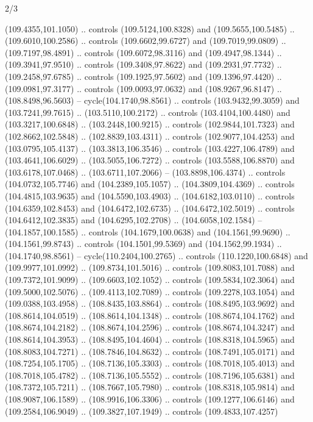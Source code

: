 \begin{flagdescription}{2/3}
\begin{scope}[shift={(0.5\flaglength,0.5)},scale=\flagwidth/320]
\begin{scope}[y=0.8pt, x=0.8pt, yscale=-1,shift={(-118.3,-146)}]
  (109.4355,101.1050) .. controls (109.5124,100.8328) and (109.5655,100.5485) ..
  (109.6010,100.2586) .. controls (109.6602,99.6727) and (109.7019,99.0809) ..
  (109.7197,98.4891) .. controls (109.6072,98.3116) and (109.4947,98.1344) ..
  (109.3941,97.9510) .. controls (109.3408,97.8622) and (109.2931,97.7732) ..
  (109.2458,97.6785) .. controls (109.1925,97.5602) and (109.1396,97.4420) ..
  (109.0981,97.3177) .. controls (109.0093,97.0632) and (108.9267,96.8147) ..
  (108.8498,96.5603) -- cycle(104.1740,98.8561) .. controls (103.9432,99.3059)
  and (103.7241,99.7615) .. (103.5110,100.2172) .. controls (103.4104,100.4480)
  and (103.3217,100.6848) .. (103.2448,100.9215) .. controls (102.9844,101.7323)
  and (102.8662,102.5848) .. (102.8839,103.4311) .. controls (102.9077,104.4253)
  and (103.0795,105.4137) .. (103.3813,106.3546) .. controls (103.4227,106.4789)
  and (103.4641,106.6029) .. (103.5055,106.7272) .. controls (103.5588,106.8870)
  and (103.6178,107.0468) .. (103.6711,107.2066) -- (103.8898,106.4374) ..
  controls (104.0732,105.7746) and (104.2389,105.1057) .. (104.3809,104.4369) ..
  controls (104.4815,103.9635) and (104.5590,103.4903) .. (104.6182,103.0110) ..
  controls (104.6359,102.8453) and (104.6472,102.6735) .. (104.6472,102.5019) ..
  controls (104.6412,102.3835) and (104.6295,102.2708) .. (104.6058,102.1584) --
  (104.1857,100.1585) .. controls (104.1679,100.0638) and (104.1561,99.9690) ..
  (104.1561,99.8743) .. controls (104.1501,99.5369) and (104.1562,99.1934) ..
  (104.1740,98.8561) -- cycle(110.2404,100.2765) .. controls (110.1220,100.6848)
  and (109.9977,101.0992) .. (109.8734,101.5016) .. controls (109.8083,101.7088)
  and (109.7372,101.9099) .. (109.6603,102.1052) .. controls (109.5834,102.3064)
  and (109.5000,102.5076) .. (109.4113,102.7089) .. controls (109.2278,103.1054)
  and (109.0388,103.4958) .. (108.8435,103.8864) .. controls (108.8495,103.9692)
  and (108.8614,104.0519) .. (108.8614,104.1348) .. controls (108.8674,104.1762)
  and (108.8674,104.2182) .. (108.8674,104.2596) .. controls (108.8674,104.3247)
  and (108.8614,104.3953) .. (108.8495,104.4604) .. controls (108.8318,104.5965)
  and (108.8083,104.7271) .. (108.7846,104.8632) .. controls (108.7491,105.0171)
  and (108.7254,105.1705) .. (108.7136,105.3303) .. controls (108.7018,105.4013)
  and (108.7018,105.4782) .. (108.7136,105.5552) .. controls (108.7196,105.6381)
  and (108.7372,105.7211) .. (108.7667,105.7980) .. controls (108.8318,105.9814)
  and (108.9087,106.1589) .. (108.9916,106.3306) .. controls (109.1277,106.6146)
  and (109.2584,106.9049) .. (109.3827,107.1949) .. controls (109.4833,107.4257)

\end{scope}
\end{scope}
\end{flagdescription}
